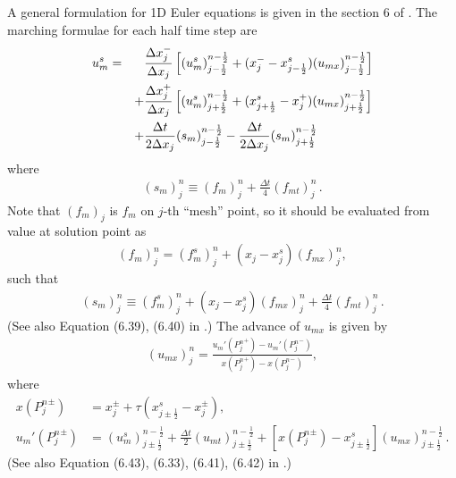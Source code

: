 \documentclass[11pt,dvips]{article}
\numberwithin{equation}{section}
\begin{document}
A general formulation for 1D Euler equations is given in the section 6 of
\cite{chang_not_2008}.  The marching formulae for each half time step are
\begin{alignat}{2}
u_m^s &=
    &&\frac{\Delta x_j^-}{\Delta x_j}
      \left[
          (u_m^s)_{j-\frac{1}{2}}^{n-\frac{1}{2}}
        + (x_j^- - x_{j-\frac{1}{2}}^s)
          (u_{mx})_{j-\frac{1}{2}}^{n-\frac{1}{2}}
      \right] \notag \\
& &+ &\frac{\Delta x_j^+}{\Delta x_j}
      \left[
          (u_m^s)_{j+\frac{1}{2}}^{n-\frac{1}{2}}
        + (x_{j+\frac{1}{2}}^s - x_j^+)
          (u_{mx})_{j+\frac{1}{2}}^{n-\frac{1}{2}}
      \right] \notag \\
& &+ &\frac{\Delta t}{2\Delta x_j}(s_m)_{j-\frac{1}{2}}^{n-\frac{1}{2}}
   -  \frac{\Delta t}{2\Delta x_j}(s_m)_{j+\frac{1}{2}}^{n-\frac{1}{2}}
    \label{e:nonunisys_us}
\end{alignat}
where
\begin{align*}
  (s_m)_j^n \equiv (f_m)_j^n + \frac{\Delta t}{4}(f_{mt})_j^n \,.
\end{align*}
Note that $(f_m)_j$ is $f_m$ on $j$-th ``mesh'' point, so it should be
evaluated from value at solution point as
\begin{align*}
  (f_m)_j^n = (f_m^s)_j^n + (x_j - x_j^s)(f_{mx})_j^n,
\end{align*}
such that
\begin{align}
  (s_m)_j^n \equiv (f_m^s)_j^n + (x_j - x_j^s)(f_{mx})_j^n
                 + \frac{\Delta t}{4}(f_{mt})_j^n \,.
    \label{e:nonunisys_s}
\end{align}
(See also Equation (6.39), (6.40) in \cite{chang_not_2008}.) The advance of
$u_{mx}$ is given by
\begin{align}
  (u_{mx})_j^n = \frac{u_m'({P_j^n}^+)-u_m'({P_j^n}^-)}
                      {x  ({P_j^n}^+)-x  ({P_j^n}^-)},
    \label{e:nonunisys_ux}
\end{align}
where
\begin{align}
  x({P_j^n}^{\pm}) &=
      x_j^{\pm} + \tau(x_{j\pm\frac{1}{2}}^s-x_j^{\pm}),
    \label{e:nonunisys_xp} \\
  u_m'({P_j^n}^{\pm}) &=
      (u_m^s)_{j\pm\frac{1}{2}}^{n-\frac{1}{2}}
    + \frac{\Delta t}{2}(u_{mt})_{j\pm\frac{1}{2}}^{n-\frac{1}{2}}
    + \left[x({P_j^n}^{\pm})-x_{j\pm\frac{1}{2}}^s\right]
      (u_{mx})_{j\pm\frac{1}{2}}^{n-\frac{1}{2}} \,.
    \label{e:nonunisys_upp}
\end{align}
(See also Equation (6.43), (6.33), (6.41), (6.42) in \cite{chang_not_2008}.)
\end{document}
